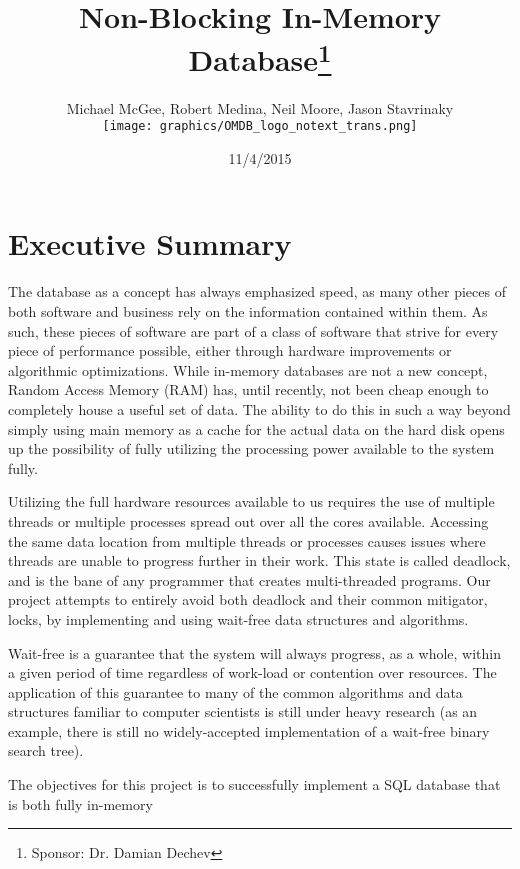 \documentclass[letterpaper, 12pt]{article}
\title{Non-Blocking In-Memory Database\thanks{Sponsor: Dr. Damian Dechev}}
\author{Michael McGee, Robert Medina, Neil Moore, Jason Stavrinaky\\[1ex]
	\texttt{[image: graphics/OMDB\_logo\_notext\_trans.png]}\\[1ex]
}
\date{11/4/2015}
\begin{document}
\maketitle
\newpage

\tableofcontents
\newpage


\section{Executive Summary}
The database as a concept has always emphasized speed, as many other pieces of both software
and business rely on the information contained within them. As such, these pieces of software
are part of a class of software that strive for every piece of performance possible, either through
hardware improvements or algorithmic optimizations. While in-memory databases are not a new concept,
Random Access Memory (RAM) has, until recently, not been cheap enough to completely house a useful
set of data. The ability to do this in such a way beyond simply using main memory as a cache for the 
actual data on the hard disk opens up the possibility of fully utilizing the processing power
available to the system fully.
\par\vspace{\baselineskip}
Utilizing the full hardware resources available to us requires the use of multiple threads or 
multiple processes spread out over all the cores available. Accessing the same data location 
from multiple threads or processes causes issues where threads are unable to progress further in their
work. This state is called deadlock, and is the bane of any programmer that creates multi-threaded
programs. Our project attempts to entirely avoid both deadlock and their common mitigator, locks,
by implementing and using wait-free data structures and algorithms.
\par\vspace{\baselineskip}
Wait-free is a guarantee that the system will always progress, as a whole, within a given period of time
regardless of work-load or contention over resources. The application of this guarantee to many
of the common algorithms and data structures familiar to computer scientists is still under heavy research
(as an example, there is still no widely-accepted implementation of a wait-free binary search tree).
\par\vspace{\baselineskip}
The objectives for this project is to successfully implement a SQL database that is both fully in-memory
\end{document}
